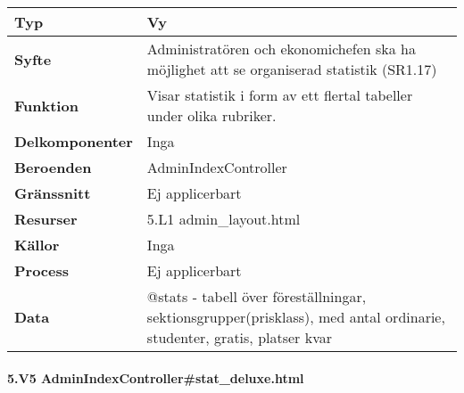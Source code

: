\documentclass[a4paper, twoside, 11pt, titlepage]{article}
\begin{document}
			\begin {table} [ht] \begin{tabular} {  p{3.5cm} p{11.6cm} }
				\hline
				{\sffamily\textbf{Typ}} & {Vy} \\
				\hline
				{\sffamily\textbf{Syfte}} & {Administratören och ekonomichefen ska ha möjlighet att se organiserad statistik (SR1.17)} \\
				\hline
				{\sffamily\textbf{Funktion}} & {Visar statistik i form av ett flertal tabeller under olika rubriker.} \\
				\hline
				{\sffamily\textbf{Delkomponenter}} & {Inga} \\
				\hline
				{\sffamily\textbf{Beroenden}} & {AdminIndexController} \\
				\hline
				{\sffamily\textbf{Gränssnitt}} & {Ej applicerbart} \\
				\hline
				{\sffamily\textbf{Resurser}} & {5.L1 admin\_layout.html} \\
				\hline
				{\sffamily\textbf{Källor}} & {Inga} \\
				\hline
				{\sffamily\textbf{Process}} & {Ej applicerbart} \\
				\hline
				{\sffamily\textbf{Data}} & {@stats - tabell över föreställningar, sektionsgrupper(prisklass), med antal ordinarie, studenter, gratis, platser kvar} \\
				\hline
			\end{tabular} \end{table} \FloatBarrier


			\paragraph{5.V5 AdminIndexController\#stat\_deluxe.html}\
\end{document}
